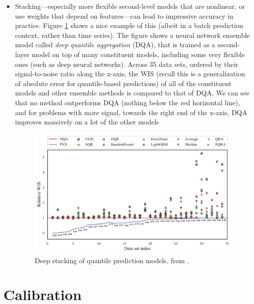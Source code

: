 \documentclass{article}
\begin{document}
\begin{itemize}
\item Stacking---especially more flexible second-level models that are
  nonlinear, or use weights that depend on features---can lead to impressive
  accuracy in practice. Figure \ref{fig:fakoor} shows a nice example of this
  (albeit in a batch prediction context, rather than time series). The figure
  shows a neural network ensemble model called \emph{deep quantile aggregation}
  (DQA), that is trained as a second-layer model on top of many constituent
  models, including some very flexible ones (such as deep neural
  networks). Across 35 data sets, ordered by their signal-to-noise ratio along 
  the x-axis, the WIS (recall this is a generalization of absolute error for
  quantile-based predictions) of all of the constituent models and other
  ensemble methods is compared to that of DQA. We can see that no method
  outperforms DQA (nothing below the red horizontal line), and for problems with
  more signal, towards the right end of the x-axis, DQA improves massively on a
  lot of the other models   

\begin{figure}[htb]
\centering
\includegraphics[width=\textwidth]{fakoor.pdf}
\caption{Deep stacking of quantile prediction models, from 
  \citet{fakoor2023flexible}.}   
\label{fig:fakoor}
\end{figure}
\end{itemize}

\section{Calibration}
\end{document}
